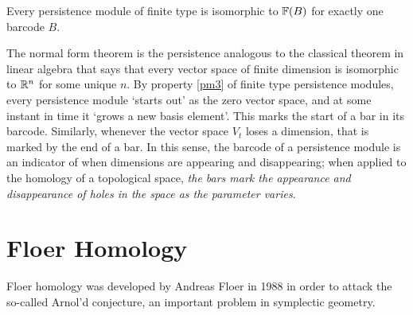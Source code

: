 \begin{theorem}
Every persistence module of finite type is isomorphic to $\mathbb{F}(B)$ for exactly one barcode $B$.
\end{theorem}

The normal form theorem is the persistence analogous to the classical theorem in linear algebra that says that every vector space of finite dimension is isomorphic to $\mathbb{R}^n$ for some unique $n$. By property \ref{pm3} of finite type persistence modules, every persistence module `starts out' as the zero vector space, and at some instant in time it `grows a new basis element'. This marks the start of a bar in its barcode. Similarly, whenever the vector space $V_t$ loses a dimension, that is marked by the end of a bar. In this sense, the barcode of a persistence module is an indicator of when dimensions are appearing and disappearing; when applied to the homology of a topological space, \emph{the bars mark the appearance and disappearance of holes in the space as the parameter varies}.


\section{Floer Homology}
\label{sec:ph}

Floer homology was developed by Andreas Floer in 1988 in order to attack the so-called Arnol'd conjecture, an important problem in symplectic geometry.